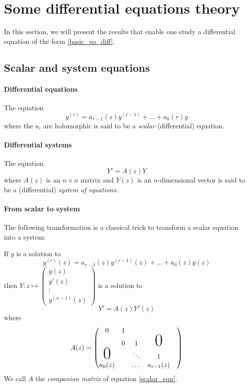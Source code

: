 \documentclass[../main.tex]{subfiles}
\begin{document}
\section{Some differential equations theory}

In this section, we will present the results that enable one study a differential equation of the form \eqref{basic_eq_diff}.

\subsection{Scalar and system equations}

\paragraph{Differential equations}

The equation
\begin{equation}\label{scalar_eq}
	y^{(r)} = a_{r - 1}(z) y^{(r - 1)} + \dots + a_0(r) y
\end{equation}
where the $a_i$ are holomorphic is said to be a \emph{scalar} (differential) equation.

\paragraph{Differential systems}

The equation
\begin{equation}\label{system_eq}
	Y' = A(z) Y
\end{equation}
where $A(z)$ is an $n \times n$ matrix and $Y(z)$ is an $n$-dimensional vector
is said to be a (differential) \emph{system of equations}.

\paragraph{From scalar to system}

The following transformation is a classical trick to transform a scalar equation into a system:

If $y$ is a solution to 
\begin{equation*}\label{scalar_eqn}
	y^{(r)}(z) = a_{r - 1}(z) y^{(r - 1)}(z) + \dots + a_0(z) y(z)
\end{equation*}
then
$Y : z \mapsto \begin{pmatrix}
y(z)\\
y'(z)\\
\vdots \\
y^{(n - 1)}(z)
\end{pmatrix}$
is a solution to
\begin{equation*}
	Y' = A(z)Y'(z)
\end{equation*} where
\begin{equation*}
A(z)=
\begin{pmatrix}
0&1&&&\\
 &0&1&\mbox{\Huge 0}\\
 \mbox{\Huge 0}& &\ddots & 1\\
a_0(z) & & \dots & a_{r - 1}(z)
\end{pmatrix}
\end{equation*}
We call $A$ the \emph{companion matrix} of equation \eqref{scalar_eqn}.
\end{document}
